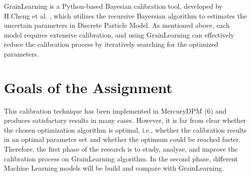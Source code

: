 \documentclass{article}
\begin{document}
GrainLearning is a Python-based Bayesian calibration tool, developed by H.Cheng et al. \cite{grainLearning}, which utilizes the recursive Bayersian algorithm to estimates the uncertain parameters in Discrete Particle Model. As mentioned above, each model requires extensive calibration, and using GrainLearning can effectively reduce the calibration process by iteratively searching for the optimized parameters. 

\section{Goals of the Assignment}

This calibration technique has been implemented in MercuryDPM (6) and produces satisfactory results in many cases. However, it is far from clear whether the chosen optimization algorithm is optimal, i.e., whether the calibration results in an optimal parameter set and whether the optimum could be reached faster. Therefore, the first phase of the research is to study, analyse, and improve the calibration process on GrainLearning algorithm. In the second phase, different Machine Learning models will be build and compare with GrainLearning. 



\end{document}
